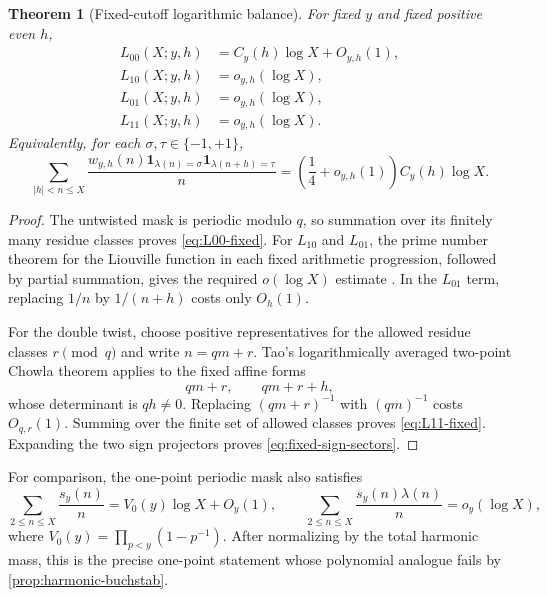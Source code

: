 \documentclass[11pt]{article}
\newtheorem{theorem}{Theorem}[section]
\theoremstyle{definition}
\theoremstyle{remark}
\newcommand{\one}{\mathbf 1}
\begin{document}
\begin{theorem}[Fixed-cutoff logarithmic balance]\label{thm:fixed-cutoff-balance}
For fixed $y$ and fixed positive even $h$,
\begin{align}
 L_{00}(X;y,h)&=C_y(h)\log X+O_{y,h}(1),\label{eq:L00-fixed}\\
 L_{10}(X;y,h)&=o_{y,h}(\log X),\label{eq:L10-fixed}\\
 L_{01}(X;y,h)&=o_{y,h}(\log X),\label{eq:L01-fixed}\\
 L_{11}(X;y,h)&=o_{y,h}(\log X).\label{eq:L11-fixed}
\end{align}
Equivalently, for each $\sigma,\tau\in\{-1,+1\}$,
\begin{equation}\label{eq:fixed-sign-sectors}
 \sum_{|h|<n\le X}
 \frac{w_{y,h}(n)
 \one_{\lambda(n)=\sigma}\one_{\lambda(n+h)=\tau}}n
 =\left(\frac14+o_{y,h}(1)\right)C_y(h)\log X.
\end{equation}
\end{theorem}

\begin{proof}
The untwisted mask is periodic modulo $q$, so summation over its finitely many residue classes proves \eqref{eq:L00-fixed}.  For $L_{10}$ and $L_{01}$, the prime number theorem for the Liouville function in each fixed arithmetic progression, followed by partial summation, gives the required $o(\log X)$ estimate \citep{MontgomeryVaughan2007}.  In the $L_{01}$ term, replacing $1/n$ by $1/(n+h)$ costs only $O_h(1)$.

For the double twist, choose positive representatives for the allowed residue classes $r\pmod q$ and write $n=qm+r$.  Tao's logarithmically averaged two-point Chowla theorem \citep[Theorem~1.2]{Tao2016} applies to the fixed affine forms
\[
 qm+r,\qquad qm+r+h,
\]
whose determinant is $qh\ne0$.  Replacing $(qm+r)^{-1}$ with $(qm)^{-1}$ costs $O_{q,r}(1)$.  Summing over the finite set of allowed classes proves \eqref{eq:L11-fixed}.  Expanding the two sign projectors proves \eqref{eq:fixed-sign-sectors}.
\end{proof}

For comparison, the one-point periodic mask also satisfies
\begin{equation}\label{eq:fixed-one-point-balance}
 \sum_{2\le n\le X}\frac{s_y(n)}n=V_0(y)\log X+O_y(1),
 \qquad
 \sum_{2\le n\le X}\frac{s_y(n)\lambda(n)}n=o_y(\log X),
\end{equation}
where $V_0(y)=\prod_{p<y}(1-p^{-1})$.  After normalizing by the total harmonic mass, this is the precise one-point statement whose polynomial analogue fails by \cref{prop:harmonic-buchstab}.
\end{document}
